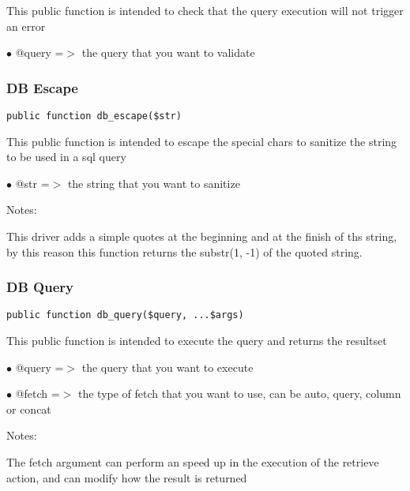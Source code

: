 \documentclass[a4paper]{article}
\begin{document}
This public function is intended to check that the query execution will not trigger an error

\begin{compactitem}
\item[\color{myblue}$\bullet$] @query =$>$ the query that you want to validate
\end{compactitem}

\hypertarget{toc341}{}
\subsubsection{DB Escape}

\begin{lstlisting}
public function db_escape($str)
\end{lstlisting}

This public function is intended to escape the special chars to sanitize the string to be used
in a sql query

\begin{compactitem}
\item[\color{myblue}$\bullet$] @str =$>$ the string that you want to sanitize
\end{compactitem}

Notes:

This driver adds a simple quotes at the beginning and at the finish of ths string, by this
reason this function returns the substr(1, -1) of the quoted string.

\hypertarget{toc342}{}
\subsubsection{DB Query}

\begin{lstlisting}
public function db_query($query, ...$args)
\end{lstlisting}

This public function is intended to execute the query and returns the resultset

\begin{compactitem}
\item[\color{myblue}$\bullet$] @query =$>$ the query that you want to execute
\item[\color{myblue}$\bullet$] @fetch =$>$ the type of fetch that you want to use, can be auto, query, column or concat
\end{compactitem}

Notes:

The fetch argument can perform an speed up in the execution of the retrieve action, and
can modify how the result is returned
\end{document}
